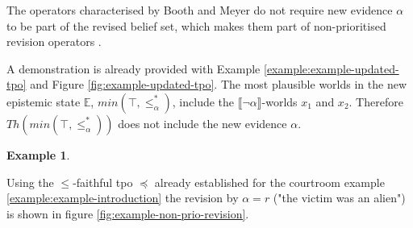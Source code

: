 \documentclass[english, 12pt]{scrartcl}
\theoremstyle{definition}
\newtheorem{example}{Example}
\theoremstyle{definition}
\theoremstyle{definition}
\newcommand{\modelsOf}[1]{\llbracket #1 \rrbracket}
\begin{document}
The operators characterised by Booth and Meyer do not require new evidence $\alpha$ to be part of the revised belief set, which makes them part of non-prioritised revision operators \cite{Hansson1999}.

A demonstration is already provided with Example \ref{example:example-updated-tpo} and Figure \ref{fig:example-updated-tpo}. The most plausible worlds in the new epistemic state $\mathbb{E}$, $min(\top, \leq_{\alpha}^{\ast})$, include the $\modelsOf{\neg\alpha}$-worlds $x_{1}$ and $x_{2}$. Therefore $Th(min(\top, \leq_{\alpha}^{\ast}))$ does not include the new evidence $\alpha$.

\begin{example}
    \label{example:example-non-prio-revision} 
    
    Using the $\leq$-faithful tpo $\preceq$ already established for the courtroom example \ref{example:example-introduction} the revision by $\alpha = r$ ("the victim was an alien") is shown in figure \ref{fig:example-non-prio-revision}.
    \begin{figure}[H]
            \centering
\end{figure}
\end{example}
\end{document}
